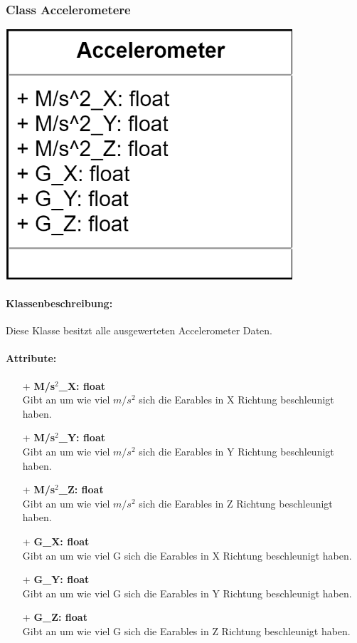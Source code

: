 \documentclass[a4paper,12pt]{article}
\begin{document}
\begin{minipage}[b]{0.5\textwidth}
	\subsubsection{Class Accelerometere}
	
	\end{minipage}
	\begin{minipage}[c]{0.5\textwidth}
	\includegraphics[width=0.8\textwidth]{bilder/BibPackageKlassen/Accelerometer.png}
\end{minipage}
\paragraph{Klassenbeschreibung:}
Diese Klasse besitzt alle ausgewerteten Accelerometer Daten.

\paragraph{Attribute:}
\begin{itemize}
	\item[+] \textbf{M/s$^2$\_X: float}\\Gibt an um wie viel $m/s^2$ sich die \Gls{Earables} in X Richtung beschleunigt haben.
	\item[+] \textbf{M/s$^2$\_Y: float}\\Gibt an um wie viel $m/s^2$ sich die \Gls{Earables} in Y Richtung beschleunigt haben.
	\item[+] \textbf{M/s$^2$\_Z: float}\\Gibt an um wie viel $m/s^2$ sich die \Gls{Earables} in Z Richtung beschleunigt haben.
	\item[+] \textbf{G\_X: float}\\Gibt an um wie viel G sich die \Gls{Earables} in X Richtung beschleunigt haben.
	\item[+] \textbf{G\_Y: float}\\Gibt an um wie viel G sich die \Gls{Earables} in Y Richtung beschleunigt haben.
	\item[+] \textbf{G\_Z: float}\\Gibt an um wie viel G sich die \Gls{Earables} in Z Richtung beschleunigt haben.
\end{itemize}
\end{document}
